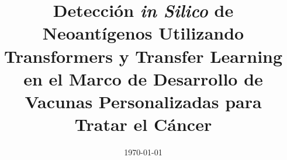 \documentclass[a4paper, 11pt, oneside]{Thesis}  %
\begin{document}
	
	
\frontmatter      %



\title  {Detección \textit{in Silico} de Neoantígenos Utilizando Transformers y Transfer Learning en el Marco de Desarrollo de Vacunas Personalizadas para Tratar el Cáncer}
\addresses  {\groupname\\\deptname\\\univname}  %
\date       {\today}
\subject    {}
\keywords   {}

\maketitle


\fancyhead{}  %
\rhead{\thepage}  %
\lhead{}  %





\pagestyle{fancy}  %
\end{document}

